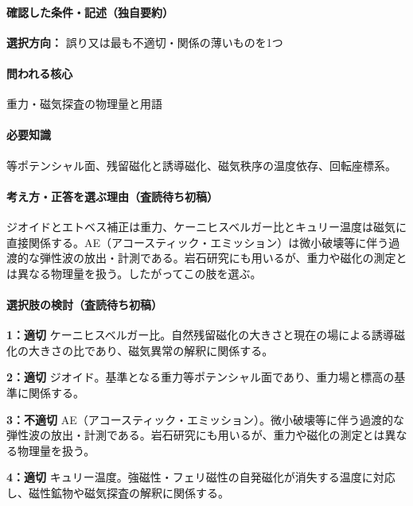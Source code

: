 \paragraph{確認した条件・記述（独自要約）}\mbox{}\par

\noindent\textbf{選択方向：} 誤り又は最も不適切・関係の薄いものを1つ\par

\paragraph{問われる核心} 重力・磁気探査の物理量と用語

\paragraph{必要知識} 等ポテンシャル面、残留磁化と誘導磁化、磁気秩序の温度依存、回転座標系。

\paragraph{考え方・正答を選ぶ理由（査読待ち初稿）} ジオイドとエトベス補正は重力、ケーニヒスベルガー比とキュリー温度は磁気に直接関係する。AE（アコースティック・エミッション）は微小破壊等に伴う過渡的な弾性波の放出・計測である。岩石研究にも用いるが、重力や磁化の測定とは異なる物理量を扱う。したがってこの肢を選ぶ。

\paragraph{選択肢の検討（査読待ち初稿）}\mbox{}\par

\noindent\textbf{1：適切} ケーニヒスベルガー比。自然残留磁化の大きさと現在の場による誘導磁化の大きさの比であり、磁気異常の解釈に関係する。\par

\noindent\textbf{2：適切} ジオイド。基準となる重力等ポテンシャル面であり、重力場と標高の基準に関係する。\par

\noindent\textbf{3：不適切} AE（アコースティック・エミッション）。微小破壊等に伴う過渡的な弾性波の放出・計測である。岩石研究にも用いるが、重力や磁化の測定とは異なる物理量を扱う。\par

\noindent\textbf{4：適切} キュリー温度。強磁性・フェリ磁性の自発磁化が消失する温度に対応し、磁性鉱物や磁気探査の解釈に関係する。\par

